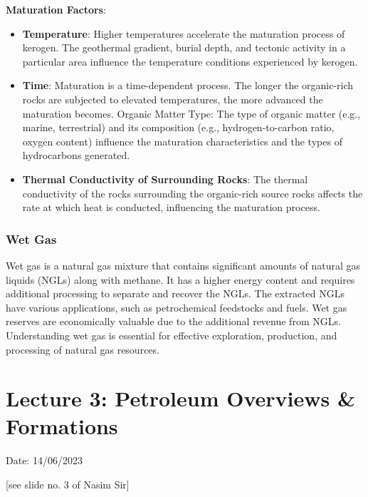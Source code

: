 \documentclass{article}
\begin{document}
\textbf{Maturation Factors}:
    \begin{itemize}
        \item \textbf{Temperature}: Higher temperatures accelerate the maturation process of kerogen. The geothermal gradient, burial depth, and tectonic activity in a particular area influence the temperature conditions experienced by kerogen.
        \item \textbf{Time}: Maturation is a time-dependent process. The longer the organic-rich rocks are subjected to elevated temperatures, the more advanced the maturation becomes.
        Organic Matter Type: The type of organic matter (e.g., marine, terrestrial) and its composition (e.g., hydrogen-to-carbon ratio, oxygen content) influence the maturation characteristics and the types of hydrocarbons generated.
        \item \textbf{Thermal Conductivity of Surrounding Rocks}: The thermal conductivity of the rocks surrounding the organic-rich source rocks affects the rate at which heat is conducted, influencing the maturation process.
    \end{itemize}

    \subsubsection*{Wet Gas}
    Wet gas is a natural gas mixture that contains significant amounts of natural gas liquids (NGLs) along with methane. It has a higher energy content and requires additional processing to separate and recover the NGLs. The extracted NGLs have various applications, such as petrochemical feedstocks and fuels. Wet gas reserves are economically valuable due to the additional revenue from NGLs. Understanding wet gas is essential for effective exploration, production, and processing of natural gas resources.\\ 


    \section{Lecture 3: Petroleum Overviews \& Formations}
    \hfill Date: 14/06/2023
    
    [see slide no. 3 of Nasim Sir]
\end{document}
